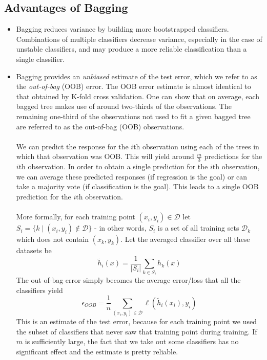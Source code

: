 \documentclass[12pt]{article}
\begin{document}
\subsection{Advantages of Bagging}
\begin{itemize}
    \item Bagging reduces variance by building more bootstrapped classifiers. Combinations of multiple classifiers decrease variance, especially in the case of unstable classifiers, and may produce a more reliable classification than a single classifier. 
    
    \item Bagging provides an \textit{unbiased} estimate of the test error, which we refer to as the \textit{out-of-bag} (OOB) error. The OOB error estimate is almost identical to that obtained by K-fold cross validation. One can show that on average, each bagged tree makes use of around two-thirds of the observations. The remaining one-third of the observations not used to fit a given bagged tree are referred to as the out-of-bag (OOB) observations.\\\\
    We can predict the response for the $i$th observation using each of the trees in which that observation was OOB. This will yield around $\frac{m}{3}$ predictions for the $i$th observation. In order to obtain a single prediction for the $i$th observation, we can average these predicted responses (if regression is the goal) or can take a majority vote (if classification is the goal). This leads to a single OOB prediction for the $i$th observation.\\\\
    More formally, for each training point $(x_i,y_i) \in  \mathcal{D}$ let $S_i = \{k \mid (x_i,y_i) \notin \mathcal{D}\}$ - in other words, $S_i$ is a set of all training sets $\mathcal{D}_k$ which does not contain $(x_k,y_k)$. Let the averaged classifier over all these datasets be 
    $$\tilde{h}_{i}(x) = \frac{1}{\lvert S_i \rvert} \sum_{k \in S_i} h_{k}(x)$$
    The out-of-bag error simply becomes the average error/loss that all the classifiers yield
    $$\epsilon_{OOB} = \frac{1}{n} \sum_{(x_i,y_i) \in \mathcal{D}} \ell (\tilde{h}_{i}(x_i),y_i)$$
    This is an estimate of the test error, because for each training point we used the subset of classifiers that never saw that training point during training. If $m$ is sufficiently large, the fact that we take out some classifiers has no significant effect and the estimate is pretty reliable.
\end{itemize}
\end{document}
